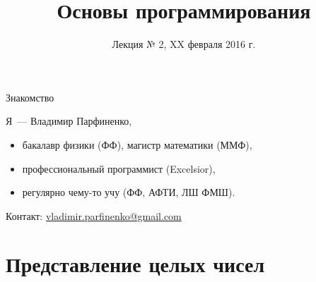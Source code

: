 %



\usepackage{pgfpages}

\usepackage{listings}

\usepackage{numprint}
\newcommand{\num}[1]{\numprint{#1}}
  \npthousandsep{\,}
  \npthousandthpartsep{}
  \npdecimalsign{,}

\newcommand{\pcnum}[1]{\ensuremath{\mathtt{#1}}}
\newcommand{\bin}[1]{\pcnum{#1}_2}
\newcommand{\hex}[1]{\pcnum{#1}_{16}}

\newcommand{\code}[1]{\texttt{#1}}

\title{Основы программирования}
\subtitle{Лекция № 2, XX февраля 2016 г.}
\date{}




\begin{frame}[plain]
  \titlepage
\end{frame}

\begin{frame}{Знакомство}

  Я~--- Владимир Парфиненко,

  \begin{itemize}
    \item бакалавр физики (ФФ), магистр математики (ММФ),
    \item профессиональный программист (Excelsior),
    \item регулярно чему-то учу (ФФ, АФТИ, ЛШ ФМШ).
  \end{itemize}

  Контакт:
  \href{mailto:vladimir.parfinenko@gmail.com}{vladimir.parfinenko@gmail.com}

\end{frame}

\section{Представление целых чисел}

